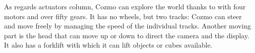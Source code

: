 	As regards actuators column, Cozmo can explore the world thanks to with four motors and over fifty gears. It has no wheels, but two tracks: Cozmo can steer and move freely by managing the speed of the individual tracks.
	Another moving part is the head that can move up or down to direct the camera and the display. It also has a forklift with which it can lift objects or cubes available.





\begin{figure}
\scalebox{0.9}{
\centering		
\begin{tikzpicture}[x=0.75pt,y=0.75pt,yscale=-1,xscale=1]
	

\end{tikzpicture}}
\end{figure}
